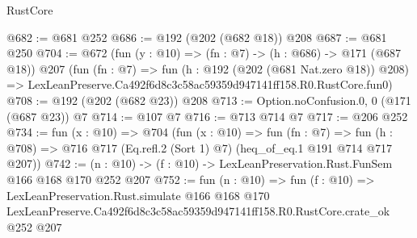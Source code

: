 \begin{lexlean}{RustCore}
\begin{coremodule}
@682 := @681 @252
@686 := @192 (@202 (@682 @18)) @208
@687 := @681 @250
@704 := @672
    (fun (y : @10) => (fn : @7) -> (h : @686) -> @171 (@687 @18))
    @207
    (fun (fn : @7) =>
    fun (h : @192 (@202 (@681 Nat.zero @18)) @208) =>
    LexLeanPreserve.Ca492f6d8c3c58ac59359d947141ff158.R0.RustCore.fun0)
@708 := @192 (@202 (@682 @23)) @208
@713 := Option.noConfusion.{0, 0} (@171 (@687 @23)) @7
@714 := @107 @7
@716 := @713 @714 @7
@717 := @206 @252
@734 := fun (x : @10) =>
  @704
    (fun (x : @10) =>
    fun (fn : @7) =>
    fun (h : @708) => @716 @717 (Eq.refl.{2} (Sort 1) @7) (heq_of_eq.{1} @191 @714 @717 @207))
@742 := (n : @10) -> (f : @10) -> LexLeanPreservation.Rust.FunSem @166 @168 @170 @252 @207
@752 := fun (n : @10) =>
  fun (f : @10) =>
  LexLeanPreservation.Rust.simulate
    @166
    @168
    @170
    LexLeanPreserve.Ca492f6d8c3c58ac59359d947141ff158.R0.RustCore.crate_ok
    @252
    @207
\end{coremodule}
\end{lexlean}
